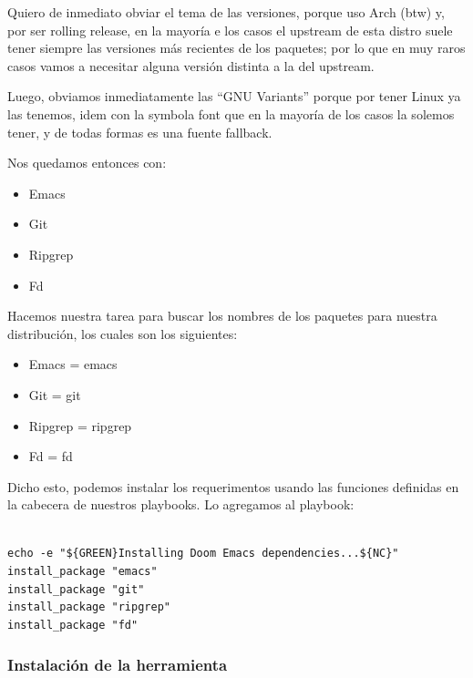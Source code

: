\documentclass[11pt]{article}
\begin{document}
Quiero de inmediato obviar el tema de las versiones, porque uso Arch (btw) y, por ser rolling release, en la mayoría e los casos el upstream de esta distro suele tener siempre las versiones más recientes de los paquetes; por lo que en muy raros casos vamos a necesitar alguna versión distinta a la del upstream.

Luego, obviamos inmediatamente las ``GNU Variants'' porque por tener Linux ya las tenemos, idem con la symbola font que en la mayoría de los casos la solemos tener, y de todas formas es una fuente fallback.

Nos quedamos entonces con:
\begin{itemize}
\item Emacs
\item Git
\item Ripgrep
\item Fd
\end{itemize}

Hacemos nuestra tarea para buscar los nombres de los paquetes para nuestra distribución, los cuales son los siguientes:

\begin{itemize}
\item Emacs = emacs
\item Git = git
\item Ripgrep = ripgrep
\item Fd = fd
\end{itemize}

Dicho esto, podemos instalar los requerimentos usando las funciones definidas en la cabecera de nuestros playbooks. Lo agregamos al playbook:

\begin{verbatim}

echo -e "${GREEN}Installing Doom Emacs dependencies...${NC}"
install_package "emacs"
install_package "git"
install_package "ripgrep"
install_package "fd"

\end{verbatim}
\subsubsection{Instalación de la herramienta}
\label{sec:orgf8dc2be}
\end{document}
